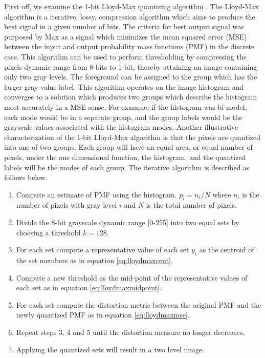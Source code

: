\documentclass[journal]{IEEEtran}
\begin{document}
\par First off, we examine the 1-bit Lloyd-Max quantizing algorithm \cite{lloyd} \cite{max}. The Lloyd-Max algorithm is a iterative, lossy, compression algorithm which aims to produce the best signal in a given number of bits. The criteria for best output signal was purposed by Max \cite{max} as a signal which minimizes the mean squared error (MSE) between the input and output probability mass functions (PMF) in the discrete case. This algorithm can be used to perform thresholding by compressing the pixels dynamic range from 8-bits to 1-bit, thereby attaining an image containing only two gray levels. The foreground can be assigned to the group which has the larger gray value label. This algorithm operates on the image histogram and converges to a solution which produces two groups which describe the histogram most accurately in a MSE sense. For example, if the histogram was bi-model, each mode would be in a separate group, and the group labels would be the grayscale values associated with the histogram modes. Another illustrative characterization of the 1-bit Lloyd-Max algorithm is that the pixels are quantized into one of two groups. Each group will have an equal area, or equal number of pixels, under the one dimensional function, the histogram, and the quantized labels will be the modes of each group. The iterative algorithm is described as follows below.

\begin{enumerate}
\item Compute an estimate of PMF using the histogram. \begin{math}p_i = n_i/N\end{math} where \begin{math}n_i\end{math} is the number of pixels with gray level \begin{math}i\end{math} and \begin{math}N\end{math} is the total number of pixels.
\item Divide the 8-bit grayscale dynamic range [0-255] into two equal sets by choosing a threshold \begin{math}k=128\end{math}.
\item For each set compute a representative value of each set \begin{math}y_i\end{math} as the centroid of the set members as in equation \ref{eq:lloydmaxcent}.
\item Compute a new threshold as the mid-point of the representative values of each set as in equation \ref{eq:lloydmaxmidpoint}.
\item For each set compute the distortion metric between the original PMF and the newly quantized PMF as in equation \ref{eq:lloydmaxmse}.
\item Repeat steps 3, 4 and 5 until the distortion measure no longer decreases.
\item Applying the quantized sets will result in a two level image.
\end{enumerate}
\end{document}
